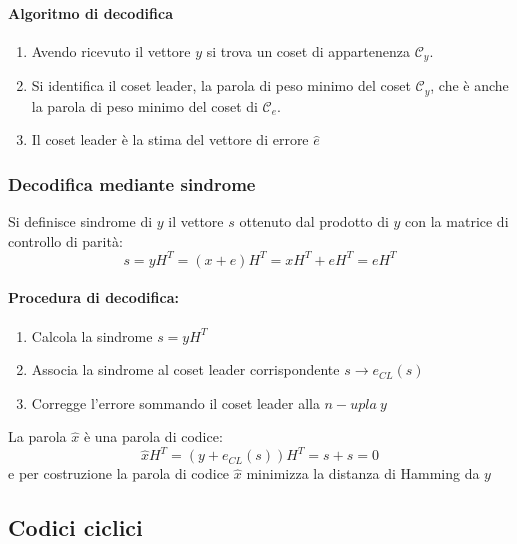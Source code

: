             \paragraph{Algoritmo di decodifica}
            \begin{enumerate}
                \item Avendo ricevuto il vettore $y$ si trova un coset di appartenenza $\mathcal{C}_y$.
                \item {Si identifica il coset leader, la parola di peso minimo del coset $\mathcal{C}_y$, che è anche la parola di peso minimo del 
                coset di $\mathcal{C}_e$.}
                \item Il coset leader è la stima del vettore di errore $\hat{e}$
            \end{enumerate}
        \subsubsection{Decodifica mediante sindrome}
            Si definisce sindrome di $y$ il vettore $s$ ottenuto dal prodotto di $y$ con la matrice di controllo di parità:
            \[
                s = yH^T = (x+e)H^T = xH^T+eH^T = eH^T    
            \]
            \paragraph{Procedura di decodifica:}
                \begin{enumerate}
                    \item {Calcola la sindrome $s = yH^T$}
                    \item {Associa la sindrome al coset leader corrispondente $s\rightarrow e_{CL}(s)$}
                    \item {Corregge l'errore sommando il coset leader alla $n-upla\ y$}
                \end{enumerate}
                La parola $\hat{x}$ è una parola di codice:
                \[
                    \hat{x}H^T= (y+e_{CL}(s))H^T = s+s =0   
                \]
                e per costruzione la parola di codice $\hat{x}$ minimizza la distanza di Hamming da $y$
    \subsection{Codici ciclici}
